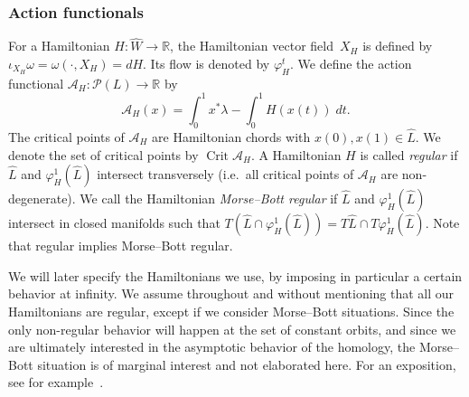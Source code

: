 \documentclass{amsart}
\newcommand{\Acal}{{\mathcal{A}}}
\newcommand{\Pcal}{{\mathcal{P}}}
\newcommand{\RR}{\mathbb{R}}
\newcommand{\WslantH}{\operatorname{WH}}
\newcommand{\Crit}{\operatorname{Crit}}
\newcommand{\haat}{\widehat}
\theoremstyle{definition}
\theoremstyle{remark}
\numberwithin{equation}{section}
\begin{document}

\subsubsection*{Action functionals}
For a Hamiltonian $H:\haat W\to\RR$, the Hamiltonian vector field~$X_H$ is defined by $\iota_{X_H}\omega=\omega(\cdot,X_H)=dH$. Its flow is denoted by $\varphi_{H}^t$. We define the action functional $\Acal_H:\Pcal(L)\to\RR$ by
\begin{equation}
	\Acal_H(x) = \int_0^1 x^*\lambda-\int_0^1 H(x(t))\;dt.
\end{equation}
The critical points of $\Acal_H$ are Hamiltonian chords with $x(0),x(1)\in \haat L$. We denote the set of critical points by $\Crit\Acal_H$. A Hamiltonian $H$ is called {\it regular}\/ if $\haat L$ and $\varphi^1_H(\haat L)$ intersect transversely (i.e.\ all critical points of $\Acal_H$ are non-degenerate). We call the Hamiltonian {\it Morse--Bott regular}\/ if $\haat L$ and $\varphi^1_H(\haat L)$ intersect in closed manifolds such that $T(\haat L\cap \varphi^1_H(\haat L))=T\haat L\cap T\varphi^1_H(\haat L)$. Note that regular implies Morse--Bott regular. 

We will later specify the Hamiltonians we use, by imposing in particular a certain behavior at infinity. We assume throughout and without mentioning that all our Hamiltonians are regular, except if we consider Morse--Bott situations. Since the only non-regular behavior will happen at the set of constant orbits, and since we are ultimately interested in the asymptotic behavior of the homology, the Morse--Bott situation is of marginal interest and not elaborated here. For an exposition, see for example~\cite{CF09}.
\end{document}
